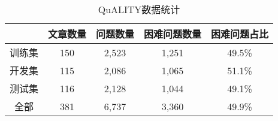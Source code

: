 \begin{table}[htbp]
    \centering
    \caption{QuALITY数据统计}
    \label{tab:2-5}
    \begin{tabular}{ccccc}
        \hline
        & 文章数量 & 问题数量 & 困难问题数量 & 困难问题占比 \\
        \hline
        训练集 & 150 & 2,523 & 1,251 & 49.5\% \\
        开发集 & 115 & 2,086 & 1,065 & 51.1\% \\
        测试集 & 116 & 2,128 & 1,044 & 49.1\% \\
        全部 & 381 & 6,737 & 3,360 & 49.9\% \\
        \hline
    \end{tabular}
\end{table}

